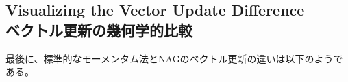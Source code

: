 \documentclass[dvipdfmx,a4paper,11pt]{jsarticle}
\begin{document}
        
        
        
        
        
\newpage
\subsection{Visualizing the Vector Update Difference\\ ベクトル更新の幾何学的比較}
最後に、標準的なモーメンタム法とNAGのベクトル更新の違いは以下のようである。
\end{document}

